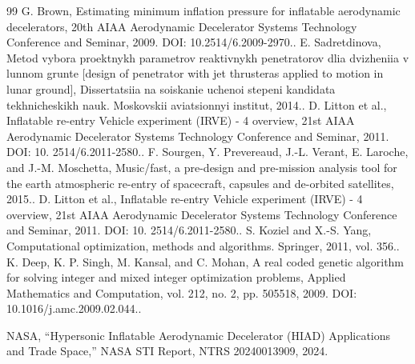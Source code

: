 \documentclass[10pt]{article}
\begin{document}
\begin{sloppypar}
\begin{thebibliography}{99}
 G. Brown, Estimating minimum inflation pressure for inflatable aerodynamic decelerators, 20th AIAA Aerodynamic Decelerator Systems Technology Conference and Seminar, 2009. DOI: 10.2514/6.2009-2970..
 E. Sadretdinova, Metod vybora proektnykh parametrov reaktivnykh penetratorov dlia dvizheniia v lunnom grunte [design of penetrator with jet thrusteras applied to motion in lunar ground], Dissertatsiia na soiskanie uchenoi stepeni kandidata tekhnicheskikh nauk. Moskovskii aviatsionnyi institut, 2014..
 D. Litton et al., Inflatable re-entry Vehicle experiment (IRVE) - 4 overview, 21st AIAA Aerodynamic Decelerator Systems Technology Conference and Seminar, 2011. DOI: 10. 2514/6.2011-2580..
 F. Sourgen, Y. Prevereaud, J.-L. Verant, E. Laroche, and J.-M. Moschetta, Music/fast, a pre-design and pre-mission analysis tool for the earth atmospheric re-entry of spacecraft, capsules and de-orbited satellites, 2015..
 D. Litton et al., Inflatable re-entry Vehicle experiment (IRVE) - 4 overview, 21st AIAA Aerodynamic Decelerator Systems Technology Conference and Seminar, 2011. DOI: 10. 2514/6.2011-2580..
 S. Koziel and X.-S. Yang, Computational optimization, methods and algorithms. Springer, 2011, vol. 356..
 K. Deep, K. P. Singh, M. Kansal, and C. Mohan, A real coded genetic algorithm for solving integer and mixed integer optimization problems, Applied Mathematics and Computation, vol. 212, no. 2, pp. 505518, 2009. DOI: 10.1016/j.amc.2009.02.044..

 NASA, ``Hypersonic Inflatable Aerodynamic Decelerator (HIAD) Applications and Trade Space,'' NASA STI Report, NTRS 20240013909, 2024.
\end{thebibliography}
\end{sloppypar}
\end{document}
